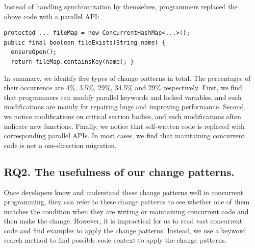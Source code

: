 Instead of handling synchronization by themselves, programmers replaced the above code with a parallel API:

\begin{lstlisting}
protected ... fileMap = new ConcurrentHashMap<...>();
public final boolean fileExists(String name) {
  ensureOpen();
  return fileMap.containsKey(name); }
\end{lstlisting}

%
%
%
%
%
%

In summary, we identify five types of change patterns in total. The percentages of their occurrence are 4\%, 3.5\%, 29\%, 34.5\% and 29\% respectively. First, we find that programmers can modify parallel keywords and locked variables, and such modifications are mainly for repairing bugs and improving performance. Second, we notice modifications on critical section bodies, and such modifications often indicate new functions. Finally, we notice that self-written code is replaced with corresponding parallel APIs. In most cases, we find that maintaining concurrent code is not a one-direction migration. 


\subsection{RQ2. The usefulness of our change patterns.}
\label{sec:result:sample}


Once developers know and understand these change patterns well in concurrent programming, they can refer to these change patterns to see whether one of them matches the condition when they are writing or maintaining concurrent code and then make the change. However, it is impractical for us to read vast concurrent code and find examples to apply the change patterns. Instead, we use a keyword search method to find possible code context to apply the change patterns.

